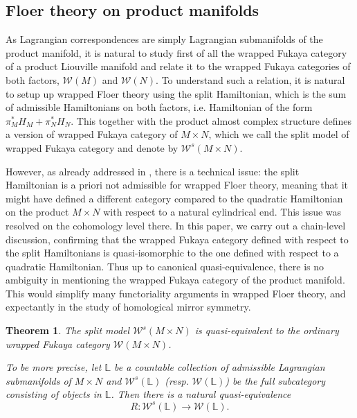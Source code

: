 \documentclass{amsart}
\newtheorem{theorem}{Theorem}[section]
\numberwithin{equation}{section}
\numberwithin{figure}{section}
\begin{document}
\subsection{Floer theory on product manifolds}
	As Lagrangian correspondences are simply Lagrangian submanifolds of the product manifold, it is natural to study first of all the wrapped Fukaya category of a product Liouville manifold and relate it to the wrapped Fukaya categories of both factors, $\mathcal{W}(M)$ and $\mathcal{W}(N)$. To understand such a relation, it is natural to setup up wrapped Floer theory using the split Hamiltonian, which is the sum of admissible Hamiltonians on both factors, i.e. Hamiltonian of the form $\pi_{M}^{*}H_{M} + \pi_{N}^{*}H_{N}$. This together with the product almost complex structure defines a version of wrapped Fukaya category of $M \times N$, which we call the split model of wrapped Fukaya category and denote by $\mathcal{W}^{s}(M \times N)$. \par
	However, as already addressed in \cite{Gao1}, there is a technical issue: the split Hamiltonian is a priori not admissible for wrapped Floer theory, meaning that it might have defined a different category compared to the quadratic Hamiltonian on the product $M \times N$ with respect to a natural cylindrical end. This issue was resolved on the cohomology level there. In this paper, we carry out a chain-level discussion, confirming that the wrapped Fukaya category defined with respect to the split Hamiltonians is quasi-isomorphic to the one defined with respect to a quadratic Hamiltonian. Thus up to canonical quasi-equivalence, there is no ambiguity in mentioning the wrapped Fukaya category of the product manifold. This would simplify many functoriality arguments in wrapped Floer theory, and expectantly in the study of homological mirror symmetry. \par

\begin{theorem}
\label{two models of wrapped Fukaya categories of product manifolds are equivalent}
	The split model $\mathcal{W}^{s}(M \times N)$ is quasi-equivalent to the ordinary wrapped Fukaya category $\mathcal{W}(M \times N)$. \par
	To be more precise, let $\mathbb{L}$ be a countable collection of admissible Lagrangian submanifolds of $M \times N$ and $\mathcal{W}^{s}(\mathbb{L})$ (resp. $\mathcal{W}(\mathbb{L})$) be the full subcategory consisting of objects in $\mathbb{L}$. Then there is a natural quasi-equivalence
\begin{equation}
R: \mathcal{W}^{s}(\mathbb{L}) \to \mathcal{W}(\mathbb{L}).
\end{equation} 
\end{theorem}
\end{document}
